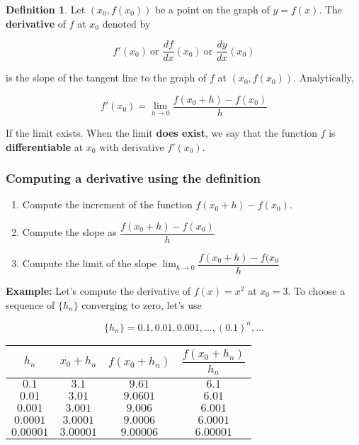 \documentclass[11pt]{article}
\providecommand{\tightlist}{%
      \setlength{\itemsep}{0pt}\setlength{\parskip}{0pt}}
\theoremstyle{definition}
\newtheorem{definition}{Definition}
\theoremstyle{plain}
\begin{document}
\begin{definition}
Let \(\left(x_0, f(x_0)\right)\) be a point on the
graph of \(y = f(x)\). The \textbf{derivative} of \(f\) at \(x_0\)
denoted by

\[
f'(x_0) \ \text{or } \frac{df}{dx}(x_0) \ \text{or } \frac{dy}{dx}(x_0)
\]

is the slope of the tangent line to the graph of \(f\) at
\(\left(x_0, f(x_0)\right)\). Analytically,

\[
f'(x_0) = \lim_{h\rightarrow 0} \frac{f(x_0 + h) - f(x_0)}{h}
\]

If the limit exists. When the limit \textbf{does exist}, we say that the
function \(f\) is \textbf{differentiable} at \(x_0\) with derivative
\(f'(x_0)\).
\end{definition}

\subsubsection{Computing a derivative using the
definition}\label{computing-a-derivative-using-the-definition}

\begin{enumerate}
\def\labelenumi{\arabic{enumi}.}
\tightlist
\item
  Compute the increment of the function \(f(x_0 + h) - f(x_0)\).
\item
  Compute the slope as \(\dfrac{f(x_0+h)-f(x_0)}{h}\)
\item
  Compute the limit of the slope
  \(\lim_{h\rightarrow 0}{\dfrac{f(x_0+h)-f(x_0}{h}}\)
\end{enumerate}

\textbf{Example:} Let's compute the derivative of \(f(x) = x^2\) at
\(x_0 = 3\). To choose a sequence of \(\{h_n\}\) converging to zero,
let's use

\[
\{h_n\} = 0.1, 0.01, 0.001,\ldots,(0.1)^n,\ldots
\]

\begin{table}[htbp]
\centering
\begin{tabular}{cccc}
\toprule
   $h_n$ &   $x_0+h_n$ &   $f(x_0 + h_n)$ &   $\dfrac{f(x_0 + h_n)}{h_n}$ \\ \midrule
  $0.1$    &     $3.1$     &          $9.61$    &                      $6.1$     \\
  $0.01$   &     $3.01$    &          $9.0601$  &                      $6.01$    \\
  $0.001$  &     $3.001$   &          $9.006$   &                      $6.001$   \\
  $0.0001$ &     $3.0001$  &          $9.0006$  &                      $6.0001$  \\
  $0.00001$  &     $3.00001$ &          $9.00006$ &                      $6.00001$ \\
\bottomrule
\end{tabular}
\end{table}
\end{document}

